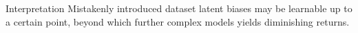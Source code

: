 \documentclass[aspectratio=169]{beamer}
\begin{document}
\begin{frame}
  \begin{alertblock}{Interpretation}
    Mistakenly introduced dataset latent biases may be learnable up to a certain point, beyond which further complex models yields diminishing returns.
  \end{alertblock}
\end{frame}

  
  
  
\end{document}
